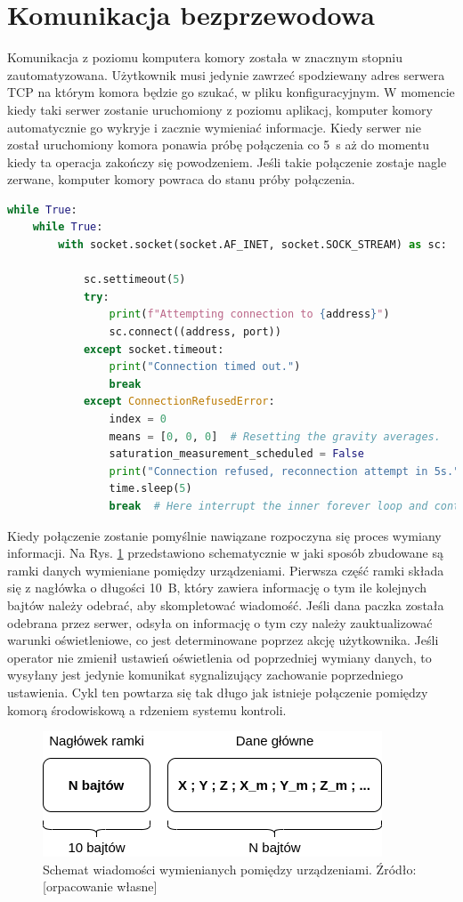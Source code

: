 \section{Komunikacja bezprzewodowa}

Komunikacja z poziomu komputera komory została w znacznym stopniu zautomatyzowana. Użytkownik musi jedynie zawrzeć spodziewany adres serwera TCP na którym komora będzie go szukać, w pliku konfiguracyjnym. W momencie kiedy taki serwer zostanie uruchomiony z poziomu aplikacj, komputer komory automatycznie go wykryje i zacznie wymieniać informacje. Kiedy serwer nie został uruchomiony komora ponawia próbę połączenia co \SI{5}{s} aż do momentu kiedy ta operacja zakończy się powodzeniem. Jeśli takie połączenie zostaje nagle zerwane, komputer komory powraca do stanu próby połączenia.
\begin{lstlisting}[language=Python,caption={Obsługa połączenia z serwerem TCP.}]
while True:
	while True:
		with socket.socket(socket.AF_INET, socket.SOCK_STREAM) as sc:
		
			sc.settimeout(5)
			try:
				print(f"Attempting connection to {address}")
				sc.connect((address, port))
			except socket.timeout:
				print("Connection timed out.")
				break
			except ConnectionRefusedError:
				index = 0
				means = [0, 0, 0]  # Resetting the gravity averages.
				saturation_measurement_scheduled = False
				print("Connection refused, reconnection attempt in 5s.")
				time.sleep(5)
				break  # Here interrupt the inner forever loop and continue to watch for the connection.
\end{lstlisting}

Kiedy połączenie zostanie pomyślnie nawiązane rozpoczyna się proces wymiany informacji. Na Rys. \ref{fig:ramka danych} przedstawiono schematycznie w jaki sposób zbudowane są ramki danych wymieniane pomiędzy urządzeniami. Pierwsza część ramki składa się z nagłówka o długości \SI{10}{B}, który zawiera informację o tym ile kolejnych bajtów należy odebrać, aby skompletować wiadomość. Jeśli dana paczka została odebrana przez serwer, odsyła on informację o tym czy należy zauktualizować warunki oświetleniowe, co jest determinowane poprzez akcję użytkownika. Jeśli operator nie zmienił ustawień oświetlenia od poprzedniej wymiany danych, to wysyłany jest jedynie komunikat sygnalizujący zachowanie poprzedniego ustawienia. Cykl ten powtarza się tak długo jak istnieje połączenie pomiędzy komorą środowiskową a rdzeniem systemu kontroli.


\begin{figure}[h]
	\centering
	\includegraphics[scale=.5]{ramka}
	\caption{Schemat wiadomości wymienianych pomiędzy urządzeniami. Źródło: [orpacowanie własne]} 
	\label{fig:ramka danych}
\end{figure}


